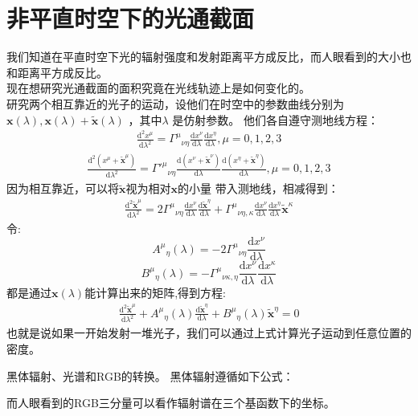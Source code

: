 \documentclass[a4paper, 12pt]{article}
\begin{document}
    \section{非平直时空下的光通截面}
    我们知道在平直时空下光的辐射强度和发射距离平方成反比，而人眼看到的大小也和距离平方成反比。\\
    现在想研究光通截面的面积究竟在光线轨迹上是如何变化的。\\
    研究两个相互靠近的光子的运动，设他们在时空中的参数曲线分别为$\mathbf x(\lambda),\mathbf x(\lambda)+\widetilde {\mathbf x}(\lambda) $   ，其中$\lambda$ 是仿射参数。
    他们各自遵守测地线方程：
    \begin{align*}
        \frac{\mathrm d^2 x^{\mu}}{\mathrm d \lambda ^2} = {\Gamma^{\mu}}_{\nu\eta}\frac{\mathrm d x^{\nu}}{\mathrm d \lambda}\frac{\mathrm d x^{\eta}}{\mathrm d \lambda} ,\mu = 0,1,2,3 
    \end{align*}
    \begin{align*}
        \frac{\mathrm d^2 (x^{\mu}+\widetilde{\mathbf x}^{\mu})}{\mathrm d \lambda ^2} = {\Gamma'^{\mu}}_{\nu\eta}\frac{\mathrm d (x^{\nu}+\widetilde{\mathbf x}^{\nu})}{\mathrm d \lambda}\frac{\mathrm d (x^{\eta}+\widetilde{\mathbf x}^{\eta})}{\mathrm d \lambda} ,\mu = 0,1,2,3 
    \end{align*}
    因为相互靠近，可以将$\widetilde{\mathbf x}$视为相对$\mathbf x$的小量
    带入测地线，相减得到：
    \begin{align*}
        \frac{\mathrm d^2 \widetilde{\mathbf x}^{\mu}}{\mathrm d\lambda ^2} = 2{\Gamma ^{\mu}}_{\nu\eta}\frac{\mathrm d x^{\nu}}{\mathrm d\lambda}\frac{\mathrm d \widetilde{\mathbf x}^\eta}{\mathrm d\lambda}  
        +{\Gamma ^{\mu}}_{\nu\eta,\kappa}\frac{\mathrm d x^{\nu}}{\mathrm d \lambda}\frac{\mathrm d x^{\eta}}{\mathrm d \lambda}\widetilde{\mathbf x}^{\kappa}
    \end{align*}
    令:
    \[{A^{\mu}}_{\eta}(\lambda) = -2{\Gamma ^{\mu}}_{\nu\eta}\frac{\mathrm d x^{\nu}}{\mathrm d\lambda}\]
    \[{B^{\mu}}_{\eta}(\lambda) = -{\Gamma ^{\mu}}_{\nu\kappa,\eta}\frac{\mathrm d x^{\nu}}{\mathrm d \lambda}\frac{\mathrm d x^{\kappa}}{\mathrm d \lambda}\]
    都是通过$\mathbf x(\lambda)$能计算出来的矩阵,得到方程:
    \begin{align*}
        \frac{\mathrm d^2 \widetilde{\mathbf x}^{\mu}}{\mathrm d\lambda ^2} +{A^{\mu}}_{\eta}(\lambda)\frac{\mathrm d \widetilde{\mathbf x}^\eta}{\mathrm d\lambda} +{B^{\mu}}_{\eta}(\lambda)\widetilde{\mathbf x}^\eta = 0
    \end{align*}
    也就是说如果一开始发射一堆光子，我们可以通过上式计算光子运动到任意位置的密度。
    

    黑体辐射、光谱和RGB的转换。
    黑体辐射遵循如下公式：

    而人眼看到的RGB三分量可以看作辐射谱在三个基函数下的坐标。
\end{document}
